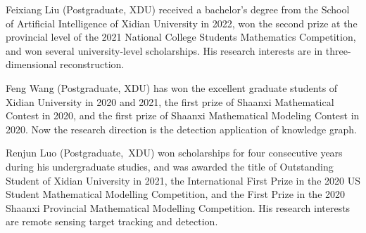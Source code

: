 \documentclass[journal]{IEEEtran}
\begin{document}
 \begin{IEEEbiography}{Feixiang Liu}
(Postgraduate, XDU) received a bachelor's degree from the School of Artificial Intelligence of Xidian University in 2022, won the second prize at the provincial level of the 2021 National College Students Mathematics Competition, and won several university-level scholarships. His research interests are in three-dimensional reconstruction. 
\end{IEEEbiography}

  \begin{IEEEbiography}{Feng Wang}
(Postgraduate, XDU) has won the excellent graduate students of Xidian University in 2020 and 2021, the first prize of Shaanxi Mathematical Contest in 2020, and the first prize of Shaanxi Mathematical Modeling Contest in 2020. Now the research direction is the detection application of knowledge graph. 
 \end{IEEEbiography}

 \begin{IEEEbiography}{Renjun Luo}
(Postgraduate,~XDU) won scholarships for four consecutive years during his undergraduate studies, and was awarded the title of Outstanding Student of Xidian University in 2021, the International First Prize in the 2020 US Student Mathematical Modelling Competition, and the First Prize in the 2020 Shaanxi Provincial Mathematical Modelling Competition. His research interests are remote sensing target tracking and detection. 
\end{IEEEbiography}
\end{document}
